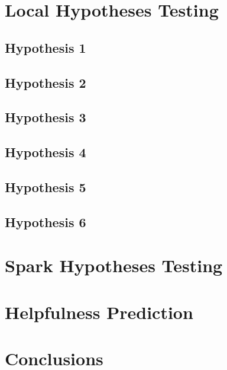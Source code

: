 \documentclass{class}
\begin{document}
\begin{multicols}{2}
    \section{Local Hypotheses Testing}
    \subsection{Hypothesis 1}
    \subsection{Hypothesis 2}
    \subsection{Hypothesis 3}
    \subsection{Hypothesis 4}
    \subsection{Hypothesis 5}
    \subsection{Hypothesis 6}
    \section{Spark Hypotheses Testing}
    \section{Helpfulness Prediction}
    \section{Conclusions}

\end{multicols}
\end{document}
